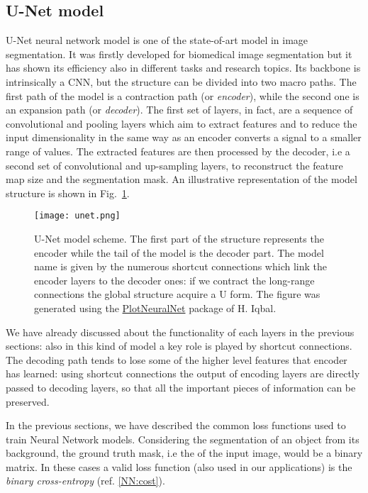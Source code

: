 \documentclass{standalone}
\begin{document}
\subsection[U-Net model]{U-Net model}\label{segmentation:Unet}

U-Net neural network model is one of the state-of-art model in image segmentation.
It was firstly developed for biomedical image segmentation but it has shown its efficiency also in different tasks and research topics.
Its backbone is intrinsically a  CNN, but the structure can be divided into two macro paths.
The first path of the model is a contraction path (or \emph{encoder}), while the second one is an expansion path (or \emph{decoder}).
The first set of layers, in fact, are a sequence of convolutional and pooling layers which aim to extract features and to reduce the input dimensionality in the same way as an encoder converts a signal to a smaller range of values.
The extracted features are then processed by the decoder, i.e a second set of convolutional and up-sampling layers, to reconstruct the feature map size and the segmentation mask.
An illustrative representation of the model structure is shown in Fig.~\ref{fig:unet}.

\begin{center}
\begin{figure}[htbp]
\centering
\texttt{[image: unet.png]}
\caption{U-Net model scheme.
The first part of the structure represents the encoder while the tail of the model is the decoder part.
The model name is given by the numerous shortcut connections which link the encoder layers to the decoder ones: if we contract the long-range connections the global structure acquire a U form.
The figure was generated using the \href{https://github.com/HarisIqbal88/PlotNeuralNet}{PlotNeuralNet} package of H. Iqbal.
}
\label{fig:unet}
\end{figure}
\end{center}

We have already discussed about the functionality of each layers in the previous sections: also in this kind of model a key role is played by shortcut connections.
The decoding path tends to lose some of the higher level features that encoder has learned: using shortcut connections the output of encoding layers are directly passed to decoding layers, so that all the important pieces of information can be preserved.

In the previous sections, we have described the common loss functions used to train Neural Network models.
Considering the  segmentation of an object from its background, the ground truth mask, i.e the  of the input image, would be a binary matrix.
In these cases a valid loss function (also used in our applications) is the \emph{binary cross-entropy} (ref. \ref{NN:cost}).
\end{document}
